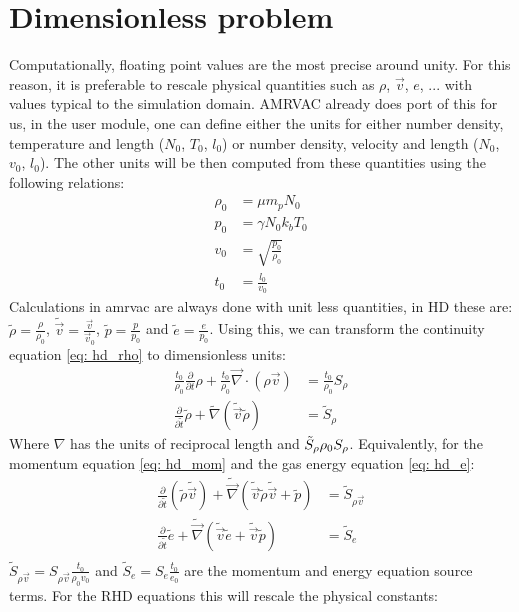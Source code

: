\section{Dimensionless problem}
Computationally, floating point values are the most precise around unity. For this reason, it is preferable to rescale physical quantities such as $\rho$, $\vec{v}$, $e$, ... with values typical to the simulation domain. AMRVAC already does port of this for us, in the user module, one can define either the units for either number density, temperature  and length ($N_0$, $T_0$, $l_0$) or  number density, velocity  and length ($N_0$, $v_0$, $l_0$). The other units will be then computed from these quantities using the following relations:
\begin{align}
\rho_0 &= \mu m_p N_0 \\
   p_0 &= \gamma N_0 k_b T_0 \\
   v_0 &= \sqrt{\frac{p_0}{\rho_0}} \\
   t_0 &= \frac{l_0}{v_0}
\end{align}
Calculations in amrvac are always done with unit less quantities, in HD these are: $\tilde{\rho} = \frac{\rho}{\rho_0}$, $\tilde{\vec{v}} = \frac{\vec{v}}{\vec{v}_0}$, $\tilde{p} = \frac{p}{p_0}$ and $\tilde{e} = \frac{e}{p_0}$. Using this, we can transform the continuity equation \eqref{eq: hd_rho} to dimensionless units:
\begin{align}
\frac{t_0}{\rho_0} \frac{\partial}{\partial t} \rho  + \frac{t_0}{\rho_0} \vec{\nabla} \cdot \left( \rho \vec{v}  \right) &= \frac{t_0}{\rho_0} S_\rho \\
\frac{\partial}{\partial \tilde{t}} \tilde{\rho} + \tilde{\nabla} \left( \tilde{\vec{v}} \tilde{\rho} \right) &= \tilde{S}_\rho
\end{align}
Where $\nabla$ has the units of reciprocal length and $\tilde{S}_\rho \def \frac{t_0}{\rho_0} S_\rho$. Equivalently, for the momentum equation \eqref{eq: hd_mom} and the gas energy equation \eqref{eq: hd_e}:
\begin{align}
\frac{\partial}{\partial \tilde{t}} \left(\tilde{\rho} \tilde{\vec{v}} \right) + \tilde{\vec{\nabla}} \left(\tilde{\vec{v}} \tilde{\rho}  \tilde{\vec{v}} + \tilde{p} \right) &= \tilde{S}_{\rho \vec{v}} \\
\frac{\partial}{\partial \tilde{t}} \tilde{e} + \tilde{\vec{\nabla}} \left(\tilde{\vec{v}} \tilde{e} + \tilde{\vec{v}} \tilde{p} \right) &= \tilde{S}_e \\
\end{align}
$\tilde{S}_{\rho \vec{v}} = S_{\rho \vec{v}} \frac{t_0}{\rho_0 v_0}$ and $\tilde{S}_e = S_e \frac{t_0}{e_0}$ are the momentum and energy equation source terms. For the RHD equations this will rescale the physical constants:
